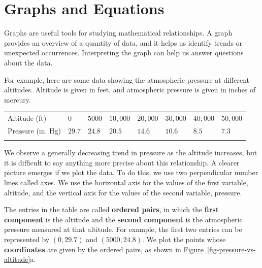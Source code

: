 \documentclass[10pt,]{book}
\newcommand{\terminology}[1]{\textbf{#1}}
\theoremstyle{plain}
\theoremstyle{definition}
\theoremstyle{definition}
\theoremstyle{definition}
\numberwithin{equation}{part}
\newcommand{\hrulethin}  {\noalign{\hrule height 0.04em}}
\begin{document}
\section[{Graphs and Equations}]{Graphs and Equations}\label{appendix-Graphs-and-Equations}
Graphs are useful tools for studying mathematical relationships. A graph provides an overview of a quantity of data, and it helps us identify trends or unexpected occurrences. Interpreting the graph can help us answer questions about the data.%
\par
For example, here are some data showing the atmospheric pressure at different altitudes. Altitude is given in feet, and atmospheric pressure is given in inches of mercury. \leavevmode%
\begin{table}
\centering
\begin{tabular}{AlA}\hrulethin
Altitude (ft)&\(0\)&\(5000\)&\(10,000\)&\(20,000\)&\(30,000\)&\(40,000\)&\(50,000\)\tabularnewline\hrulethin
Pressure (in. Hg)&\(29.7\)&\(24.8\)&\(20.5\)&\(14.6\)&\(10.6\)&\(8.5\)&\(7.3\)\tabularnewline\hrulethin
\end{tabular}
\end{table}
%
\par
We observe a generally decreasing trend in pressure as the altitude increases, but it is difficult to say anything more precise about this relationship. A clearer picture emerges if we plot the data. To do this, we use two perpendicular number lines called axes. We use the horizontal axis for the values of the first variable, altitude, and the vertical axis for the values of the second variable, pressure.%
\par
The entries in the table are called \terminology{ordered pairs}, in which the \terminology{first component} is the altitude and the \terminology{second component} is the atmospheric pressure measured at that altitude. For example, the first two entries can be represented by \((0, 29.7)\) and \((5000, 24.8)\). We plot the points whose \terminology{coordinates} are given by the ordered pairs, as shown in \hyperref[fig-pressure-vs-altitude]{Figure~\ref{fig-pressure-vs-altitude}}a. \leavevmode%
\end{document}
